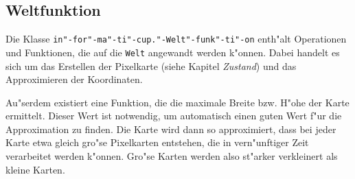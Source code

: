 \subsection{Weltfunktion}
Die Klasse \texttt{in"-for"-ma"-ti"-cup."-Welt"-funk"-ti"-on} enth"alt Operationen und Funktionen, die auf die \texttt{Welt} angewandt werden k"onnen. Dabei handelt es sich um das Erstellen der Pixelkarte (siehe Kapitel \emph{Zustand}) und das Approximieren der Koordinaten. 

Au"serdem existiert eine Funktion, die die maximale Breite bzw. H"ohe der Karte ermittelt. Dieser Wert ist notwendig, um automatisch einen guten Wert f"ur die Approximation zu finden. Die Karte wird dann so approximiert, dass bei jeder Karte etwa gleich gro"se Pixelkarten entstehen, die in vern"unftiger Zeit verarbeitet werden k"onnen. Gro"se Karten werden also st"arker verkleinert als kleine Karten. 
